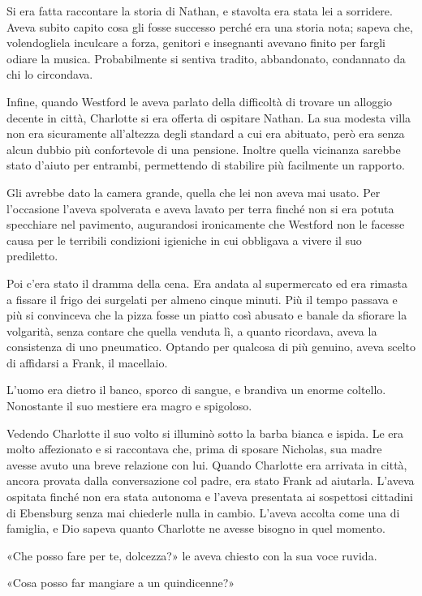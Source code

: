 Si era fatta raccontare la storia di Nathan, e stavolta era stata lei a sorridere. Aveva subito
capito cosa gli fosse successo perché era una storia nota; sapeva che, volendogliela inculcare a
forza, genitori e insegnanti avevano finito per fargli odiare la musica. Probabilmente si sentiva
tradito, abbandonato, condannato da chi lo circondava.

Infine, quando Westford le aveva parlato della difficoltà di trovare un alloggio decente in città,
Charlotte si era offerta di ospitare Nathan. La sua modesta villa non era sicuramente all'altezza
degli standard a cui era abituato, però era senza alcun dubbio più confortevole di una pensione.
Inoltre quella vicinanza sarebbe stato d'aiuto per entrambi, permettendo di stabilire più facilmente
un rapporto.

Gli avrebbe dato la camera grande, quella che lei non aveva mai usato. Per l'occasione l'aveva
spolverata e aveva lavato per terra finché non si era potuta specchiare nel pavimento, augurandosi
ironicamente che Westford non le facesse causa per le terribili condizioni igieniche in cui
obbligava a vivere il suo prediletto.

Poi c'era stato il dramma della cena. Era andata al supermercato ed era rimasta a fissare il frigo
dei surgelati per almeno cinque minuti. Più il tempo passava e più si convinceva che la pizza fosse
un piatto così abusato e banale da sfiorare la volgarità, senza contare che quella venduta lì, a
quanto ricordava, aveva la consistenza di uno pneumatico. Optando per qualcosa di più genuino, aveva
scelto di affidarsi a Frank, il macellaio.

L'uomo era dietro il banco, sporco di sangue, e brandiva un enorme coltello. Nonostante il suo
mestiere era magro e spigoloso.

Vedendo Charlotte il suo volto si illuminò sotto la barba bianca e ispida. Le era molto affezionato
e si raccontava che, prima di sposare Nicholas, sua madre avesse avuto una breve relazione con lui.
Quando Charlotte era arrivata in città, ancora provata dalla conversazione col padre, era stato
Frank ad aiutarla. L'aveva ospitata finché non era stata autonoma e l'aveva presentata ai sospettosi
cittadini di Ebensburg senza mai chiederle nulla in cambio. L'aveva accolta come una di famiglia, e
Dio sapeva quanto Charlotte ne avesse bisogno in quel momento.

«Che posso fare per te, dolcezza?» le aveva chiesto con la sua voce ruvida.

«Cosa posso far mangiare a un quindicenne?»

